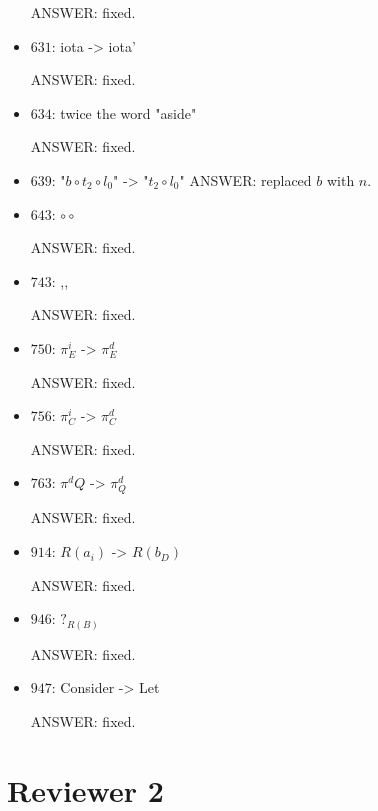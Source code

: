 \documentclass[english,11pt,a4paper]{article}
\begin{document}
\begin{itemize}
ANSWER: fixed.

\item $631$: iota -> iota'

ANSWER: fixed.

\item $634$: twice the word "aside"

ANSWER: fixed.

\item $639$: "$b \circ t_2 \circ l_0$" -> "$t_2 \circ l_0$"
ANSWER: replaced $b$ with $n$.

\item $643$: $\circ \circ$

ANSWER: fixed.

\item $743$: ,,

ANSWER: fixed.

\item $750$: $\pi^i_E$ -> $\pi^d_E$

ANSWER: fixed.

\item $756$: $\pi^i_C$ -> $\pi^d_C$

ANSWER: fixed.

\item $763$: $\pi^dQ$ -> $\pi^d_Q$

ANSWER: fixed.

\item $914$: $R(a_i)$ -> $R(b_D)$

ANSWER: fixed.

\item $946$: $?_{R(B)}$

ANSWER: fixed.

\item $947$: Consider -> Let

ANSWER: fixed.

\end{itemize} 
\section*{Reviewer 2}
\end{document}
